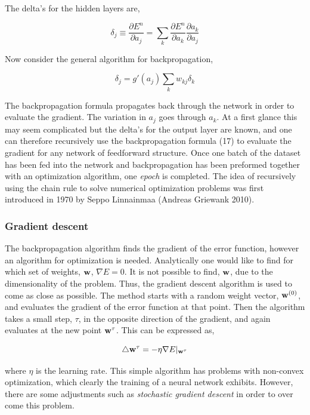 \documentclass[12pt, letterpaper]{amsart}%
\begin{document}
The delta's for the hidden layers are,

\begin{equation}
    \delta_j \equiv \frac{\partial E^n}{\partial a_j} = \sum_k \frac{\partial E^n}{\partial a_k} \frac{\partial a_k}{\partial a_j}
\end{equation}

Now consider the general algorithm for backpropagation,

\begin{equation}
    \delta_j = g \prime (a_j) \sum_k w_{kj} \delta_k
\end{equation}

The backpropagation formula propagates back through the network in order to evaluate the gradient. The variation in $a_j$ goes through $a_k$. At a first glance this may seem complicated but the delta's for the output layer are known, and one can therefore recursively use the backpropagation formula (17) to evaluate the gradient for any network of feedforward structure. Once one batch of the dataset has been fed into the network and backpropagation has been preformed together with an optimization algorithm, one \textit{epoch} is completed. The idea of recursively using the chain rule to solve numerical optimization problems was first introduced in 1970 by Seppo Linnainmaa (Andreas Griewank 2010).

\subsubsection{Gradient descent}
The backpropagation algorithm finds the gradient of the error function, however an algorithm for optimization is needed. Analytically one would like to find for which set of weights, $\bold{w}$, $\nabla E=0$. It is not possible to find, $\bold{w}$, due to the dimensionality of the problem. Thus, the gradient descent algorithm is used to come as close as possible. The method starts with a random weight vector, $\bold{w}^{(0)}$, and evaluates the gradient of the error function at that point. Then the algorithm takes a small step, $\tau$, in the opposite direction of the gradient, and again evaluates at the new point $\bold{w}^{\tau}$. This can be expressed as,

\begin{equation}
\triangle \bold{w}^{\tau} = - \eta \nabla E \vert_{\bold{w}^{\tau}}
\end{equation}

where $\eta$ is the learning rate. This simple algorithm has problems with non-convex optimization, which clearly the training of a neural network exhibits. However, there are some adjustments such as \textit{stochastic gradient descent} in order to over come this problem.
\end{document}
